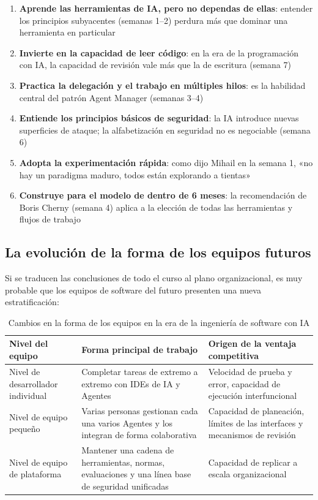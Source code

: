 \documentclass[a4paper]{article}
\begin{document}
\begin{enumerate}
    \item \textbf{Aprende las herramientas de IA, pero no dependas de ellas}: entender los principios subyacentes (semanas 1--2) perdura más que dominar una herramienta en particular
    \item \textbf{Invierte en la capacidad de leer código}: en la era de la programación con IA, la capacidad de revisión vale más que la de escritura (semana 7)
    \item \textbf{Practica la delegación y el trabajo en múltiples hilos}: es la habilidad central del patrón Agent Manager (semanas 3--4)
    \item \textbf{Entiende los principios básicos de seguridad}: la IA introduce nuevas superficies de ataque; la alfabetización en seguridad no es negociable (semana 6)
    \item \textbf{Adopta la experimentación rápida}: como dijo Mihail en la semana 1, «no hay un paradigma maduro, todos están explorando a tientas»
    \item \textbf{Construye para el modelo de dentro de 6 meses}: la recomendación de Boris Cherny (semana 4) aplica a la elección de todas las herramientas y flujos de trabajo
\end{enumerate}

\subsection{La evolución de la forma de los equipos futuros}

Si se traducen las conclusiones de todo el curso al plano organizacional, es muy probable que los equipos de software del futuro presenten una nueva estratificación:

\begin{table}[H]
\centering
\begin{tabular}{p{} p{} p{}}
\toprule
Nivel del equipo & Forma principal de trabajo & Origen de la ventaja competitiva \\
\midrule
Nivel de desarrollador individual & Completar tareas de extremo a extremo con IDEs de IA y Agentes & Velocidad de prueba y error, capacidad de ejecución interfuncional \\
Nivel de equipo pequeño & Varias personas gestionan cada una varios Agentes y los integran de forma colaborativa & Capacidad de planeación, límites de las interfaces y mecanismos de revisión \\
Nivel de equipo de plataforma & Mantener una cadena de herramientas, normas, evaluaciones y una línea base de seguridad unificadas & Capacidad de replicar a escala organizacional \\
\bottomrule
\end{tabular}
\caption{Cambios en la forma de los equipos en la era de la ingeniería de software con IA}
\end{table}
\end{document}
